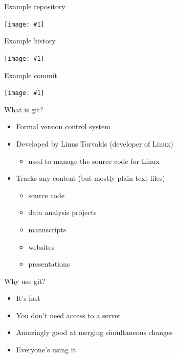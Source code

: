 \documentclass[12pt,t]{beamer}
\newcommand{\bi}{\begin{itemize}}
\newcommand{\bbi}{\vspace{24pt} \begin{itemize} \itemsep8pt}
\newcommand{\ei}{\end{itemize}}
\newcommand{\figh}[2]{\centerline{\texttt{[image: \#1]}}}
\begin{document}
\begin{frame}[c]{Example repository}

\figh{Images/example_repo}{0.80}

\onslide<2|handout 0>{
\vspace*{-0.65\textheight}
\figh{Images/example_repo_zoom}{0.55}
}

\note{
}
\end{frame}


\begin{frame}[c]{Example history}

\figh{Images/example_history}{0.80}

\note{
}
\end{frame}

\begin{frame}[c]{Example commit}

\figh{Images/example_commit}{0.80}
\note{
}
\end{frame}




\begin{frame}{What is git?}
\bbi
\item Formal version control system
\item Developed by Linus Torvalds (developer of Linux)
\bi
\item used to manage the source code for Linux
\ei
\item Tracks any content (but mostly plain text files)
\bi
\item source code
\item data analysis projects
\item manuscripts
\item websites
\item presentations
\ei
\ei

\note{
}
\end{frame}


\begin{frame}{Why use git?}
\bbi
\item It's fast
\item You don't need access to a server
\item Amazingly good at merging simultaneous changes
\item Everyone's using it
\ei

\note{
}
\end{frame}
\end{document}
